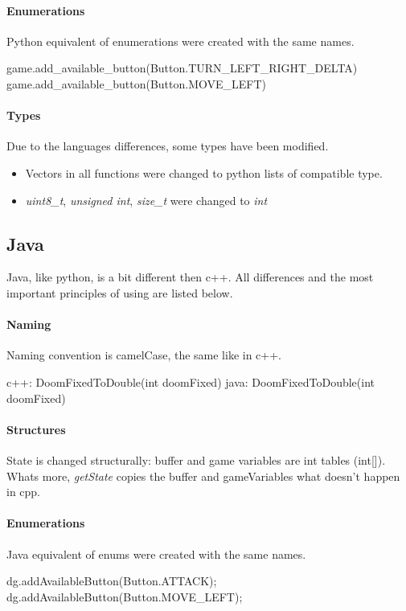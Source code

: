 \paragraph {Enumerations}
Python equivalent of enumerations were created with the same names.
\begin{cblock}
game.add_available_button(Button.TURN_LEFT_RIGHT_DELTA)
game.add_available_button(Button.MOVE_LEFT)
\end{cblock}
\paragraph {Types}
Due to the languages differences, some types have been modified.
\begin{itemize} 
\item Vectors in all functions were changed to python lists of compatible type.

\item  \emph{uint8\_t}, \emph{unsigned int}, \emph{size\_t} were changed to \emph{int}
\end{itemize}


\subsection{Java}
Java, like python, is a bit different then c++. All differences and the most important principles of using are listed below.

\paragraph {Naming}
 Naming convention is camelCase, the same like in c++. 
\begin{cblock}
c++: DoomFixedToDouble(int doomFixed)
java: DoomFixedToDouble(int doomFixed)
\end{cblock}
\paragraph {Structures}
State is changed structurally: buffer and game variables are int tables (int[]). Whats more, \emph{getState} copies the buffer and gameVariables what doesn't happen in cpp. 
\paragraph {Enumerations}
Java equivalent of enums were created with the same names.
\begin{cblock}
dg.addAvailableButton(Button.ATTACK);
dg.addAvailableButton(Button.MOVE_LEFT);
\end{cblock}
